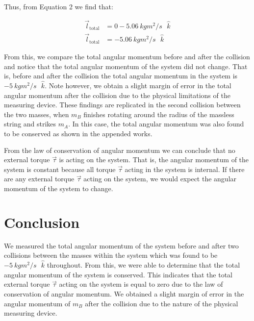 \documentclass[12pt]{article}
\begin{document}
Thus, from Equation 2 we find that:

\begin{equation*}
    \begin{split}
        \vec{l}_\text{total} & = 0 - \SI{5.06}{kg m^2/s} \text{ $\hat{k}$} \\
        \vec{l}_\text{total} & = \SI{-5.06}{kg m^2/s} \text{ $\hat{k}$}
    \end{split}
\end{equation*}

From this, we compare the total angular momentum before and after the collision and notice that the total angular momentum of the system did not change. That is, before and after the collision the total angular momentum in the system is $\SI{-5}{kg m^2/s} \text{ $\hat{k}$}$. Note however, we obtain a slight margin of error in the total angular momentum after the collision due to the physical limitations of the measuring device. These findings are replicated in the second collision between the two masses, when $m_B$ finishes rotating around the radius of the massless string and strikes $m_A$. In this case, the total angular momentum was also found to be conserved as shown in the appended works.

From the law of conservation of angular momentum we can conclude that no external torque $\vec{\tau}$ is acting on the system. That is, the angular momentum of the system is constant because all torque $\vec{\tau}$ acting in the system is internal. If there are any external torque $\vec{\tau}$ acting on the system, we would expect the angular momentum of the system to change.

\section{Conclusion}
We measured the total angular momentum of the system before and after two collisions between the masses within the system which was found to be $\SI{-5}{kg m^2/s} \text{ $\hat{k}$}$ throughout. From this, we were able to determine that the total angular momentum of the system is conserved. This indicates that the total external torque $\vec{\tau}$ acting on the system is equal to zero due to the law of conservation of angular momentum. We obtained a slight margin of error in the angular momentum of $m_B$ after the collision due to the nature of the physical measuring device.
\end{document}
